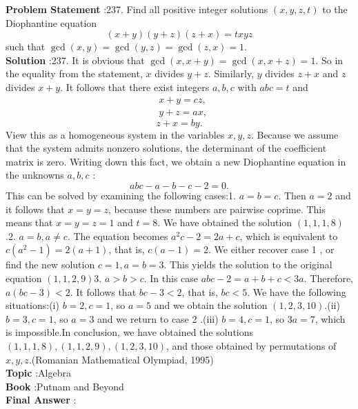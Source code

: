 \documentclass[10pt]{article}
\begin{document}
\textbf{Problem Statement} :237. Find all positive integer solutions $(x, y, z, t)$ to the Diophantine equation$$ (x+y)(y+z)(z+x)=t x y z $$such that $\operatorname{gcd}(x, y)=\operatorname{gcd}(y, z)=\operatorname{gcd}(z, x)=1$.\\
\textbf{Solution} :237. It is obvious that $\operatorname{gcd}(x, x+y)=\operatorname{gcd}(x, x+z)=1$. So in the equality from the statement, $x$ divides $y+z$. Similarly, $y$ divides $z+x$ and $z$ divides $x+y$. It follows that there exist integers $a, b, c$ with $a b c=t$ and$$ \begin{aligned} &x+y=c z, \\ &y+z=a x, \end{aligned} $$$$ z+x=b y . $$View this as a homogeneous system in the variables $x, y, z$. Because we assume that the system admits nonzero solutions, the determinant of the coefficient matrix is zero. Writing down this fact, we obtain a new Diophantine equation in the unknowns $a, b, c$ :$$ a b c-a-b-c-2=0 . $$This can be solved by examining the following cases:1. $a=b=c$. Then $a=2$ and it follows that $x=y=z$, because these numbers are pairwise coprime. This means that $x=y=z=1$ and $t=8$. We have obtained the solution $(1,1,1,8)$.2. $a=b, a \neq c$. The equation becomes $a^{2} c-2=2 a+c$, which is equivalent to $c\left(a^{2}-1\right)=2(a+1)$, that is, $c(a-1)=2$. We either recover case 1 , or find the new solution $c=1, a=b=3$. This yields the solution to the original equation $(1,1,2,9)$3. $a>b>c$. In this case $a b c-2=a+b+c<3 a$. Therefore, $a(b c-3)<2$. It follows that $b c-3<2$, that is, $b c<5$. We have the following situations:(i) $b=2, c=1$, so $a=5$ and we obtain the solution $(1,2,3,10)$.(ii) $b=3, c=1$, so $a=3$ and we return to case 2 .(iii) $b=4, c=1$, so $3 a=7$, which is impossible.In conclusion, we have obtained the solutions $(1,1,1,8),(1,1,2,9),(1,2,3,10)$, and those obtained by permutations of $x, y, z$.(Romanian Mathematical Olympiad, 1995)\\
\textbf{Topic} :Algebra\\
\textbf{Book} :Putnam and Beyond\\
\textbf{Final Answer} :\\
\end{document}
